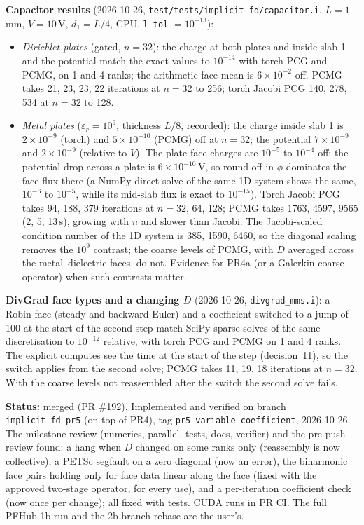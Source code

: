 \documentclass[11pt]{article}
\newcommand{\status}[1]{\textcolor{marlinteal}{\textbf{Status:}} #1}
\begin{document}
\textbf{Capacitor results} (2026-10-26, \texttt{test/tests/implicit\_fd/capacitor.i},
$L = 1$\,mm, $V = 10$\,V, $d_1 = L/4$, CPU, \texttt{l\_tol} $= 10^{-13}$):
\begin{itemize}[leftmargin=*]
\item \emph{Dirichlet plates} (gated, $n = 32$): the charge at both plates and inside
slab 1 and the potential match the exact values to $10^{-14}$ with torch PCG and PCMG,
on 1 and 4 ranks; the arithmetic face mean is $6\times10^{-2}$ off. PCMG takes 21, 23,
23, 22 iterations at $n = 32$ to 256; torch Jacobi PCG 140, 278, 534 at $n = 32$ to 128.
\item \emph{Metal plates} ($\varepsilon_r = 10^9$, thickness $L/8$, recorded): the charge
inside slab 1 is $2\times10^{-9}$ (torch) and $5\times10^{-10}$ (PCMG) off at $n = 32$;
the potential $7\times10^{-9}$ and $2\times10^{-9}$ (relative to $V$). The plate-face
charges are $10^{-5}$ to $10^{-4}$ off: the potential drop across a plate is
$6\times10^{-10}$\,V, so round-off in $\phi$ dominates the face flux there (a
NumPy direct solve of the same 1D system shows the same, $10^{-6}$ to $10^{-5}$,
while its mid-slab flux is exact to $10^{-15}$). Torch Jacobi PCG takes 94, 188, 379
iterations at $n = 32$, 64, 128; PCMG takes 1763, 4597, 9565 (2, 5, 13\,s), growing
with $n$ and slower than Jacobi. The Jacobi-scaled condition number of the 1D system is
385, 1590, 6460, so the diagonal scaling removes the $10^9$ contrast; the coarse levels
of PCMG, with $D$ averaged across the metal--dielectric faces, do not. Evidence for
PR4a (or a Galerkin coarse operator) when such contrasts matter.
\end{itemize}

\textbf{DivGrad face types and a changing $D$} (2026-10-26,
\texttt{divgrad\_mms.i}): a Robin face (steady and backward Euler) and a coefficient
switched to a jump of 100 at the start of the second step match SciPy sparse solves of
the same discretisation to $10^{-12}$ relative, with torch PCG and PCMG on 1 and 4 ranks.
The explicit computes see the time at the start of the step (decision~11), so the switch
applies from the second solve; PCMG takes 11, 19, 18 iterations at $n = 32$. With the
coarse levels not reassembled after the switch the second solve fails.

\status{merged (PR \#192). Implemented and verified on branch \texttt{implicit\_fd\_pr5} (on top of PR4),
tag \texttt{pr5-variable-coefficient}, 2026-10-26. The milestone review (numerics,
parallel, tests, docs, verifier) and the pre-push review found: a hang when $D$ changed on
some ranks only (reassembly is now collective), a PETSc segfault on a zero diagonal (now an
error), the biharmonic face pairs holding only for face data linear along the face (fixed
with the approved two-stage operator, for every use), and a per-iteration coefficient check
(now once per change); all fixed with tests. CUDA runs in PR CI. The full PFHub 1b run and
the 2b branch rebase are the user's.}
\end{document}
